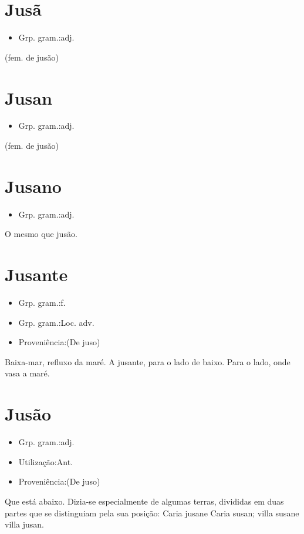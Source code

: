 \documentclass{article}
\begin{document}
\section{Jusã}
\begin{itemize}
\item {Grp. gram.:adj.}
\end{itemize}
(fem. de \textunderscore jusão\textunderscore )
\section{Jusan}
\begin{itemize}
\item {Grp. gram.:adj.}
\end{itemize}
(fem. de \textunderscore jusão\textunderscore )
\section{Jusano}
\begin{itemize}
\item {Grp. gram.:adj.}
\end{itemize}
O mesmo que \textunderscore jusão\textunderscore .
\section{Jusante}
\begin{itemize}
\item {Grp. gram.:f.}
\end{itemize}
\begin{itemize}
\item {Grp. gram.:Loc. adv.}
\end{itemize}
\begin{itemize}
\item {Proveniência:(De \textunderscore juso\textunderscore )}
\end{itemize}
Baixa-mar, refluxo da maré.
\textunderscore A jusante\textunderscore , para o lado de baixo.
Para o lado, onde vasa a maré.
\section{Jusão}
\begin{itemize}
\item {Grp. gram.:adj.}
\end{itemize}
\begin{itemize}
\item {Utilização:Ant.}
\end{itemize}
\begin{itemize}
\item {Proveniência:(De \textunderscore juso\textunderscore )}
\end{itemize}
Que está abaixo.
Dizia-se especialmente de algumas terras, divididas em duas partes que se distinguiam pela sua posição: \textunderscore Caria jusan\textunderscore  e \textunderscore Caria susan\textunderscore ; \textunderscore villa susan\textunderscore  e \textunderscore villa jusan\textunderscore .
\end{document}
